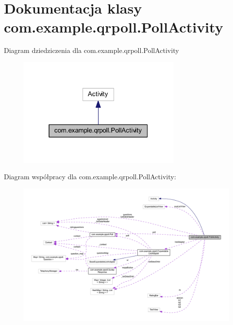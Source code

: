 \hypertarget{classcom_1_1example_1_1qrpoll_1_1_poll_activity}{\section{Dokumentacja klasy com.\+example.\+qrpoll.\+Poll\+Activity}
\label{classcom_1_1example_1_1qrpoll_1_1_poll_activity}
}


Diagram dziedziczenia dla com.\+example.\+qrpoll.\+Poll\+Activity
\nopagebreak
\begin{figure}[H]
\begin{center}
\leavevmode
\includegraphics[width=232pt]{classcom_1_1example_1_1qrpoll_1_1_poll_activity__inherit__graph}
\end{center}
\end{figure}


Diagram współpracy dla com.\+example.\+qrpoll.\+Poll\+Activity\+:
\nopagebreak
\begin{figure}[H]
\begin{center}
\leavevmode
\includegraphics[width=350pt]{classcom_1_1example_1_1qrpoll_1_1_poll_activity__coll__graph}
\end{center}
\end{figure}
